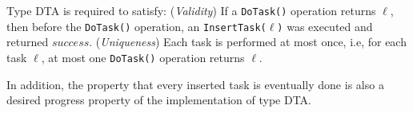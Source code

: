 Type DTA is required to satisfy: (\emph{Validity}) If a \texttt{DoTask()} operation returns $\ell$, then before the
\texttt{DoTask()} operation, an \texttt{InsertTask(}$\ell$\texttt{)} was executed and returned $success$.
(\emph{Uniqueness}) Each task is performed at most once, i.e, for each task $\ell$, at most one \texttt{DoTask()}
operation returns $\ell$.

In addition, the property that every inserted task is eventually done is also a desired progress property
of the implementation of type DTA.
